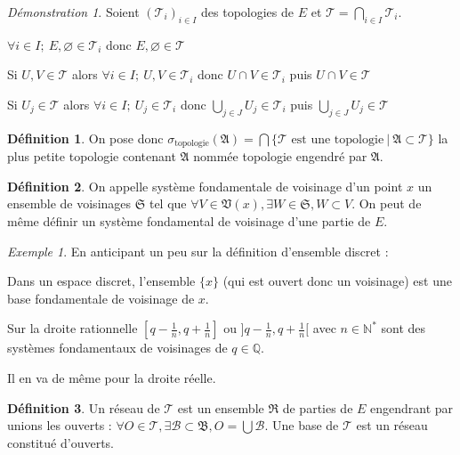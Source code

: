 \documentclass[a4paper, 11pt, french]{book}
\newenvironment{itemise}{\itemize}{\enditemize}
\theoremstyle{plain} %
\theoremstyle{definition} %
\newtheorem{definition}{Définition}
\theoremstyle{remark} %
\newtheorem{exemple}{Exemple}
\newtheorem*{demonstration}{Démonstration}
\newcommand{\1}{\mathds{1}}
\newcommand\vide{\varnothing}
\newcommand{\N}{\mathbb{N}}
\newcommand{\Q}{\mathbb{Q}}
\newcommand\ens[2]{\{#1 \ |\ #2\}}
\begin{document}
\begin{demonstration}
	Soient $(\mathscr{T}_i)_{i\in I}$ des topologies de $E$ et $\mathscr{T}=\bigcap_{i\in I}\mathscr{T}_i$.
	\begin{itemise}
		\item $\forall i\in I;\ E, \vide\in\mathscr{T}_i$ donc $E, \vide\in\mathscr{T}$
		\item Si $U, V\in\mathscr{T}$ alors $\forall i\in I;\ U, V\in\mathscr{T}_i$ donc $U\cap V\in\mathscr{T}_i$ puis $U\cap V\in\mathscr{T}$
		\item Si $U_j\in\mathscr{T}$ alors $\forall i\in I;\ U_j\in\mathscr{T}_i$ donc $\bigcup_{j\in J} U_j\in\mathscr{T}_i$ puis $\bigcup_{j\in J} U_j\in\mathscr{T}$
	\end{itemise}
\end{demonstration}

\begin{definition}
	On pose donc $\sigma_\text{topologie}(\mathfrak{A})=\bigcap\ens{\text{$\mathscr{T}$ est une topologie}}{\mathfrak{A}\subset\mathscr{T}}$ la plus petite topologie contenant $\mathfrak{A}$ nommée topologie engendré par $\mathfrak{A}$.
\end{definition}

\begin{definition}
	On appelle système fondamentale de voisinage d'un point $x$ un ensemble de voisinages $\mathfrak{S}$ tel que $\forall V\in\mathfrak{V}(x), \exists W\in\mathfrak{S}, W\subset V$. On peut de même définir un système fondamental de voisinage d'une partie de $E$.
\end{definition}

\begin{exemple}
	En anticipant un peu sur la définition d'ensemble discret :
	\begin{itemise}
		\item Dans un espace discret, l'ensemble $\{x\}$ (qui est ouvert donc un voisinage) est une base fondamentale de voisinage de $x$.
		\item Sur la droite rationnelle $[q-\frac{1}{n}, q+\frac{1}{n}]$ ou $]q-\frac{1}{n}, q+\frac{1}{n}[$ avec $n\in\N^*$ sont des systèmes fondamentaux de voisinages de $q\in\Q$.
		\item Il en va de même pour la droite réelle.
	\end{itemise}
\end{exemple}

\begin{definition}
	Un réseau de $\mathscr{T}$ est un ensemble $\mathfrak{R}$ de parties de $E$ engendrant par unions les ouverts :  $\forall O\in\mathscr{T}, \exists\mathcal{B}\subset\mathfrak{B}, O=\bigcup\mathcal{B}$.
	Une base de $\mathscr{T}$ est un réseau constitué d'ouverts.
\end{definition}
\end{document}
